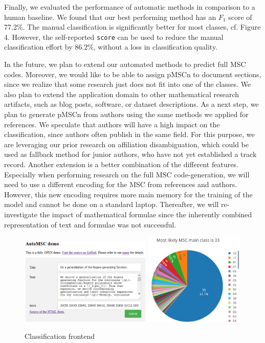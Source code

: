 Finally, we evaluated the performance of automatic methods in comparison to a human baseline.
We found that our best performing method has an $F_1$ score of 77.2\%.
The manual classification is significantly better for most classes, cf. Figure 4.
However, the self-reported \texttt{score} can be used to reduce the manual classification effort by 86.2\%, without a loss in classification quality.

In the future, we plan to extend our automated methods to predict full MSC codes.
Moreover, we would like to be able to assign pMSCn to document sections, since we realize that some research just does not fit into one of the classes.
We also plan to extend the application domain to other mathematical research artifacts, such as blog posts, software, or dataset descriptions.
As a next step, we plan to generate pMSCn from authors using the same methods we applied for references.
We speculate that authors will have a high impact on the classification, since authors often publish in the same field.
For this purpose, we are leveraging our prior research on affiliation disambiguation, which could be used as fallback method for junior authors, who have not yet established a track record.
Another extension is a better combination of the different features.
Especially when performing research on the full MSC code-generation, we will need to use a different encoding for the MSC from references and authors.
However, this new encoding requires more main memory for the training of the model and cannot be done on a standard laptop.
Thereafter, we will re-investigate the impact of mathematical formulae since the inherently combined representation of text and formulae was not successful.
\begin{figure}[t]
  \centering
  \includegraphics[width=0.56\textwidth]{webFrontend2.png}
  \includegraphics[width=0.42\textwidth]{webFrontend1.png}
  \caption{Classification frontend}\label{fgScreenshot}
\end{figure}

